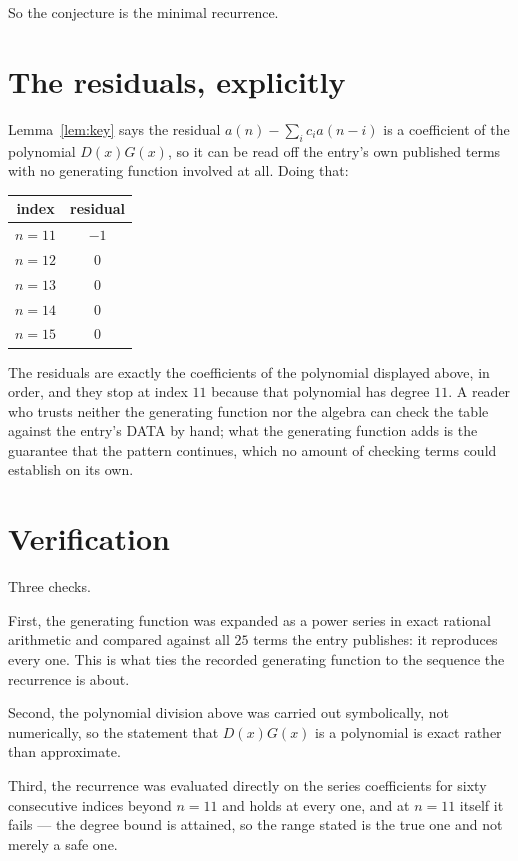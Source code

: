 \documentclass[11pt,a4paper]{article}
\theoremstyle{plain}
\theoremstyle{definition}
\begin{document}
So the conjecture is the minimal recurrence.

\section{The residuals, explicitly}

Lemma~\ref{lem:key} says the residual $a(n)-\sum_ic_ia(n-i)$ is a coefficient of the
polynomial $D(x)G(x)$, so it can be read off the entry's own published terms with no
generating function involved at all. Doing that:
\begin{center}
\begin{tabular}{cc}
index & residual \\ \hline
$n=11$ & $-1$ \\
$n=12$ & $0$ \\
$n=13$ & $0$ \\
$n=14$ & $0$ \\
$n=15$ & $0$
\end{tabular}
\end{center}
The residuals are exactly the coefficients of the polynomial displayed above, in order, and
they stop at index $11$ because that polynomial has degree $11$. A reader who trusts
neither the generating function nor the algebra can check the table against the entry's DATA
by hand; what the generating function adds is the guarantee that the pattern continues, which
no amount of checking terms could establish on its own.

\section{Verification}

Three checks.

First, the generating function was expanded as a power series in exact rational arithmetic and
compared against all $25$ terms the entry publishes: it reproduces every one. This is
what ties the recorded generating function to the sequence the recurrence is about.

Second, the polynomial division above was carried out symbolically, not numerically, so the
statement that $D(x)G(x)$ is a polynomial is exact rather than approximate.

Third, the recurrence was evaluated directly on the series coefficients for sixty consecutive
indices beyond $n=11$ and holds at every one, and at $n=11$ itself it fails --- the
degree bound is attained, so the range stated is the true one and not merely a safe one.
\end{document}
